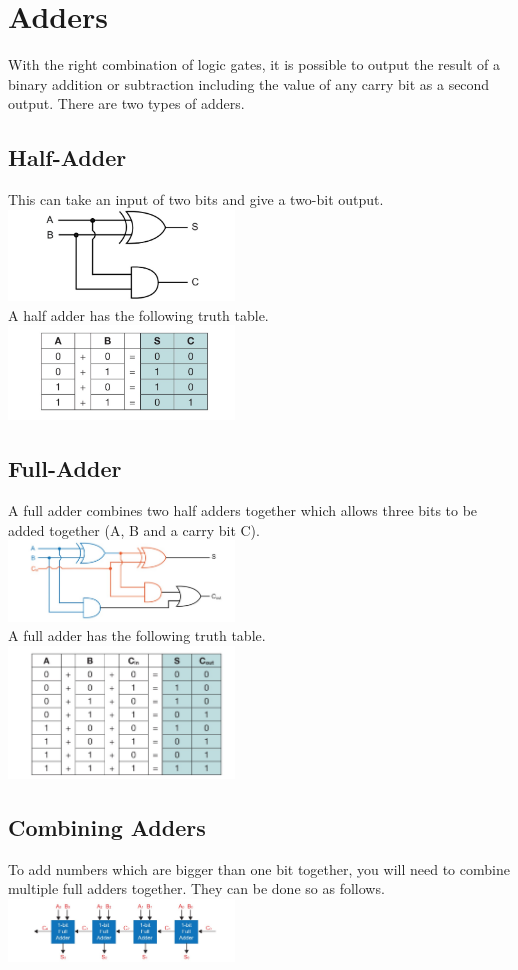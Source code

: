 \documentclass[a4paper,11pt, twocolumn]{article}
\begin{document}
\section{Adders}
With the right combination of logic gates, it is possible to output the result of a binary addition or subtraction including the value of any carry bit as a second output. There are two types of adders.
\subsection{Half-Adder}
This can take an input of two bits and give a two-bit output.\\
\includegraphics[width=0.45\textwidth]{halfAdder.jpg}\\
A half adder has the following truth table.\\
\includegraphics[width=0.45\textwidth]{halfAdderTable.jpg}\\
\subsection{Full-Adder}
A full adder combines two half adders together which allows three bits to be added together (A, B and a carry bit C). \\
\includegraphics[width=0.45\textwidth]{fullAdder.jpg}\\
A full adder has the following truth table.\\
\includegraphics[width=0.45\textwidth]{fullAdderTable.jpg}
\subsection{Combining Adders}
To add numbers which are bigger than one bit together, you will need to combine multiple full adders together. They can be done so as follows.\\
\includegraphics[width=0.45\textwidth]{manyAdders.jpg}
\end{document}
